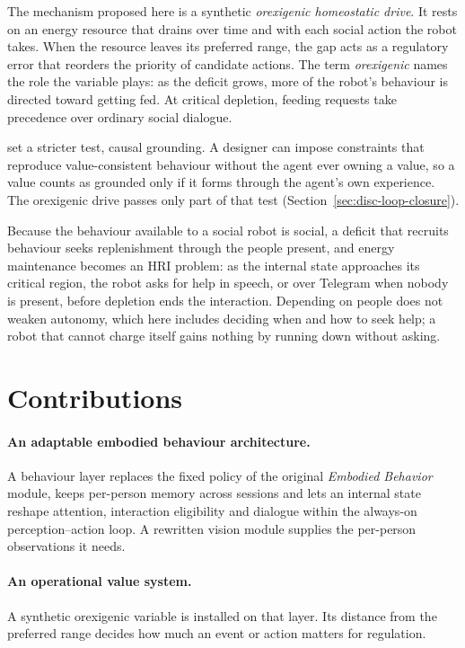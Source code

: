The mechanism proposed here is a synthetic \emph{orexigenic homeostatic drive}. It rests on an energy resource that drains over time and with each social action the robot takes. When the resource leaves its preferred range, the gap acts as a regulatory error that reorders the priority of candidate actions. The term \emph{orexigenic} names the role the variable plays: as the deficit grows, more of the robot's behaviour is directed toward getting fed. At critical depletion, feeding requests take precedence over ordinary social dialogue.

\citet{Pasquali2026ISEED} set a stricter test, causal grounding. A designer can impose constraints that reproduce value-consistent behaviour without the agent ever owning a value, so a value counts as grounded only if it forms through the agent's own experience. The orexigenic drive passes only part of that test (Section~\ref{sec:disc-loop-closure}).

Because the behaviour available to a social robot is social, a deficit that recruits behaviour seeks replenishment through the people present, and energy maintenance becomes an HRI problem: as the internal state approaches its critical region, the robot asks for help in speech, or over Telegram when nobody is present, before depletion ends the interaction. Depending on people does not weaken autonomy, which here includes deciding when and how to seek help; a robot that cannot charge itself gains nothing by running down without asking.

\section{Contributions}
\label{sec:intro-contributions}

\paragraph{An adaptable embodied behaviour architecture.}
A behaviour layer replaces the fixed policy of the original \emph{Embodied Behavior} module, keeps per-person memory across sessions and lets an internal state reshape attention, interaction eligibility and dialogue within the always-on perception--action loop. A rewritten vision module supplies the per-person observations it needs.

\paragraph{An operational value system.}
A synthetic orexigenic variable is installed on that layer. Its distance from the preferred range decides how much an event or action matters for regulation.

